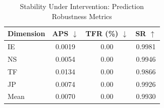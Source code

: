 \begin{table}[h]
\centering
\caption{Stability Under Intervention: Prediction Robustness Metrics}
\label{tab:stability_analysis}
\begin{tabular}{lccc}
\hline
Dimension & APS $\downarrow$ & TFR (\%) $\downarrow$ & SR $\uparrow$ \\
\hline
IE & 0.0019 & 0.00 & 0.9981 \\
NS & 0.0054 & 0.00 & 0.9946 \\
TF & 0.0134 & 0.00 & 0.9866 \\
JP & 0.0074 & 0.00 & 0.9926 \\
\hline
Mean & 0.0070 & 0.00 & 0.9930 \\
\hline
\end{tabular}
\end{table}
